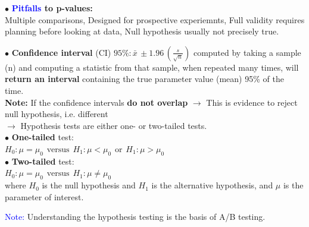 \documentclass[letterpaper, 10.5pt,landscape]{article}
\begin{document}
\begin{multicols*}{3}
\vspace{2pt}
$\bullet$ \textbf{\textcolor{blue}{Pitfalls} to p-values:} \\
Multiple comparisons, Designed for prospective experiemnts, Full validity requires planning before looking at data, Null hypothesis usually not precisely true.

\vspace{2pt}
$\bullet$ \textbf{Confidence interval} (CI) $\boxed{95 \% : \bar{x} \, \pm 1.96 \, (\frac{s}{\sqrt{n}})} $ computed by taking a sample (n) and computing a statistic from that sample,  when repeated many times, will \textbf{return an interval} containing the true parameter value (mean) 95\% of the time. \\
\textbf{Note:} If the confidence intervals \textbf{do not overlap} $\rightarrow$ This is evidence to reject null hypothesis, i.e. different \\



\vspace{3pt}
$\rightarrow$ Hypothesis tests are either one- or two-tailed tests. \\
$\bullet$ \textbf{One-tailed} test: \\
\(\boxed{H_{0}: \mu = \mu_{0}} \hspace{5pt}\text{versus} \hspace{5pt} \boxed{H_{1}: \mu < \mu_{0} \hspace{5pt} \text{or} \hspace{5pt} H_{1}: \mu > \mu_{0}} \) \\
$\bullet$ \textbf{Two-tailed} test: \\
\(\boxed{H_{0}: \mu = \mu_{0}} \hspace{5pt}\text{versus} \hspace{5pt} \boxed{H_{1}: \mu \neq \mu_{0}}  \) \\
where $H_{0}$ is the null hypothesis and $H_{1}$ is the alternative hypothesis, and $\mu$ is the parameter of interest. \\



\vspace{3pt}




\textcolor{blue}{Note:} Understanding the hypothesis testing is the basis of A/B testing.


\end{multicols*}
\end{document}
